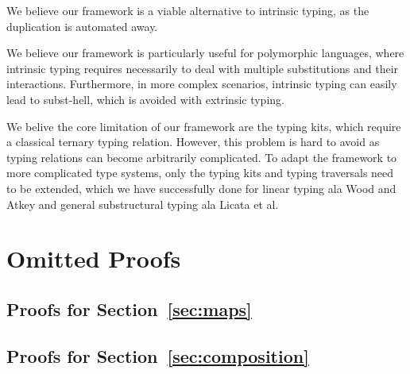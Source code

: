 \documentclass[a4paper, UKenglish, cleveref, autoref, thm-restate]{lipics-v2021}
\newenvironment{LibCode*}{%
  \begin{tcolorbox}[%
    colframe=white,%
    boxrule=0.0pt,%
    top=2.5pt,%
    left=2.5pt,%
    bottom=2.5pt,%
    right=2.5pt,%
    before skip=5pt,%
    after skip=5pt,%
    boxsep=0pt%
  ]
}{%
  \end{tcolorbox}%
}
\newcommand*\LibCode[1]{\begin{LibCode*}{#1}\end{LibCode*}}
\newcommand*\AppCode[1]{{#1}}
\begin{document}
  We believe our framework is a viable alternative to intrinsic
  typing, as the duplication is automated away.

  We believe our framework is particularly useful for polymorphic languages,
  where intrinsic typing requires necessarily to deal with multiple substitutions
  and their interactions. Furthermore, in more complex scenarios, intrinsic typing
  can easily lead to subst-hell, which is avoided with extrinsic typing.
  
  We belive the core limitation of our framework are the typing kits, which
  require a classical ternary typing relation. However, this problem is hard
  to avoid as typing relations can become arbitrarily complicated.
  To adapt the framework to more complicated type systems, only the typing
  kits and typing traversals need to be extended, which we have successfully
  done for linear typing ala Wood and Atkey\cite{DBLP:journals/corr/abs-2005-02247} and
  general substructural typing ala Licata et al\cite{DBLP:conf/rta/LicataSR17}.

  

  \clearpage
  \appendix
  \onecolumn

  \section{Omitted Proofs}
  \label{sec:proofs}

  \subsection{Proofs for Section~\ref{sec:maps}}
  \LibCode\KIdLift
  \LibCode\KIdLiftProof


  \subsection{Proofs for Section~\ref{sec:composition}}
  \LibCode\KCKitAp
  \LibCode\KCKitApProof

  \LibCode\KDistLiftCompose
  \LibCode\KDistLiftComposeProof

  \LibCode\KCommLiftWeaken
  \LibCode\KCommLiftWeakenProof

  \LibCode\KCommLiftWeakenTraverse
  \LibCode\KCommLiftWeakenTraverseProof

  \LibCode\KWeakenCancelsSingle
  \LibCode\KWeakenCancelsSingleProof
\end{document}
